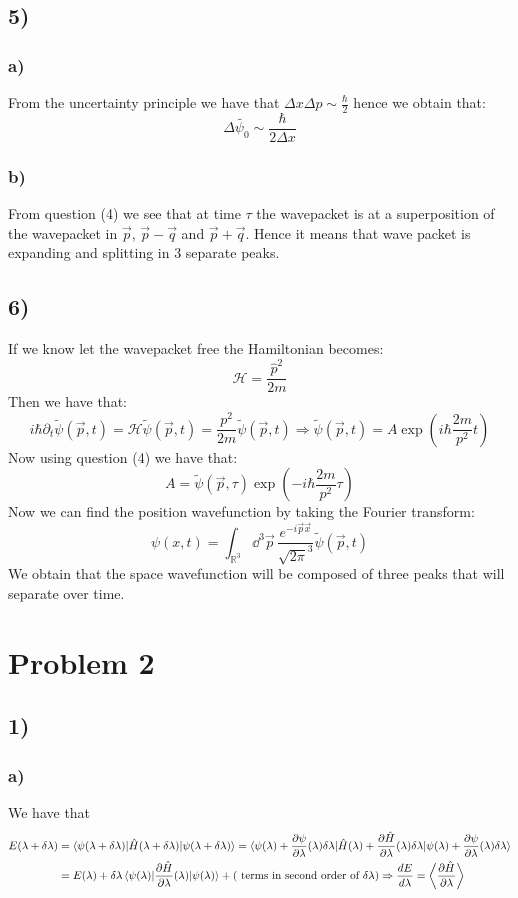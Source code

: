 \documentclass[10pt,a4paper]{book}
\newcommand{\p}{\partial}
\begin{document}
\subsection*{5)}
\subsubsection*{a)}
From the uncertainty principle we have that $\Delta x \Delta p \sim \frac{\hbar}{2}$ hence we obtain that:
\[
\Delta \tilde{\psi_0} \sim \frac{\hbar}{2 \Delta x}
\]

\subsubsection*{b)}
From question (4) we see that at time $\tau$ the wavepacket is at a superposition of the wavepacket in $\vec{p}$, $\vec{p} - \vec{q}$ and $\vec{p} + \vec{q}$. Hence it means that wave packet is expanding and splitting in 3 separate peaks.

\subsection*{6)}
If we know let the wavepacket free the Hamiltonian becomes:
\[
\mathcal{H} = \frac{\hat{p}^2}{2m}
\]
Then we have that:
\[
i\hbar \partial_t \tilde{\psi}(\vec{p}, t) = \mathcal{H} \tilde{\psi}(\vec{p}, t) = \frac{p^2}{2m} \tilde{\psi}(\vec{p}, t) \Rightarrow \tilde{\psi}(\vec{p}, t) = A \exp(i\hbar\frac{2m}{p^2}t)
\]
Now using question (4) we have that:
\[
A = \tilde{\psi}(\vec{p}, \tau)\exp(-i\hbar \frac{2m}{p^2}\tau)
\]
Now we can find the position wavefunction by taking the Fourier transform:
\[
\psi(x, t) =  \int_{\mathbb{R}^3} \dd^3 \vec{p}\, \frac{e^{-i \vec{p} \vec{x}}}{\sqrt{2 \pi}^3} \tilde{\psi}(\vec{p}, t)
\]
We obtain that the space wavefunction will be composed of three peaks that will separate over time.

\section*{Problem 2}

\subsection*{1)}
\subsubsection*{a)}
We have that 
\begin{align*}
E(\lambda+\delta\lambda)&=\braket{\psi(\lambda+\delta\lambda)|\hat{H}(\lambda+\delta\lambda)|\psi(\lambda+\delta\lambda)}=\braket{\psi(\lambda)+\frac{\p\psi}{\p\lambda}(\lambda)\delta\lambda|\hat{H}(\lambda)+\frac{\p\hat{H}}{\p\lambda}(\lambda)\delta\lambda|\psi(\lambda)+\frac{\p\psi}{\p\lambda}(\lambda)\delta\lambda}\\
&=E(\lambda)+\delta\lambda\braket{\psi(\lambda)|\frac{\p\hat{H}}{\p\lambda}(\lambda)|\psi(\lambda)}+(\text{ terms in second order of }\delta\lambda)\Rightarrow \frac{dE}{d\lambda}=\bigg\langle\frac{\p\hat{H}}{\p\lambda}\bigg\rangle
\end{align*}
\end{document}
